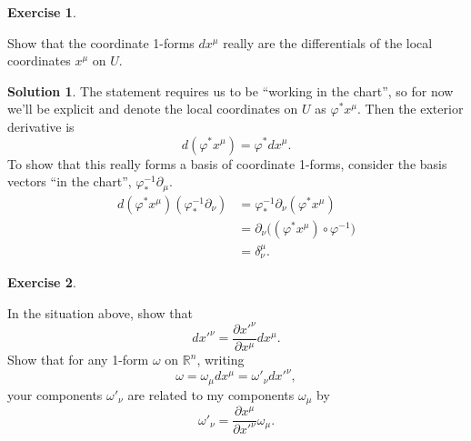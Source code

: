 \documentclass[11pt, a4paper]{report}
\theoremstyle{definition}
\newtheorem{ex}{Exercise}[part]
\newtheorem{sol}{Solution}[part]
\begin{document}
\begin{ex}\label{ex:coordinatetransformation1form}

Show that the coordinate 1-forms $dx^\mu$ really are the differentials of the local coordinates $x^\mu$ on $U$.

\end{ex}

\begin{sol}

The statement requires us to be ``working in the chart'', so for now we'll be explicit and denote the local coordinates on $U$ as $\varphi^*x^\mu$. Then the exterior derivative is
\[
    d(\varphi^*x^\mu) = \varphi^* dx^\mu.
\]
To show that this really forms a basis of coordinate 1-forms, consider the basis vectors ``in the chart'', $\varphi_*^{-1}\partial_\mu$.
\begin{align*}
    d(\varphi^* x^\mu)(\varphi_*^{-1}\partial_\nu) &= \varphi_*^{-1}\partial_\nu (\varphi^* x^\mu) \\
        &= \partial_\nu \bigl( (\varphi^* x^\mu) \circ \varphi^{-1} \bigr) \\
        &= \delta_\nu^\mu.
\end{align*}

\end{sol}

\begin{ex}\label{ex:transform1form}

In the situation above, show that
\[
    dx'^\nu = \frac{\partial x'^\nu}{\partial x^\mu} dx^\mu.
\]
Show that for any 1-form $\omega$ on $\mathbb{R}^n$, writing
\[
    \omega = \omega_\mu dx^\mu = \omega'_\nu dx'^\nu,
\]
your components $\omega'_\nu$ are related to my components $\omega_\mu$ by
\[
    \omega'_\nu = \frac{\partial x^\mu}{\partial x'^\nu} \omega_\mu.
\]

\end{ex}
\end{document}
